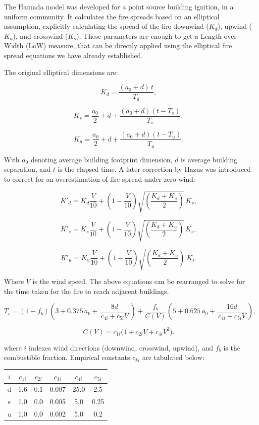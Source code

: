 The Hamada model was developed for a point source building ignition, in a uniform community. It calculates the fire spreads based on an elliptical assumption, explicitly calculating the spread of the fire downwind ($K_d$), upwind ($K_u$), and crosswind ($K_s$). These parameters are enough to get a Length over Width (LoW) measure, that can be directly applied using the elliptical fire spread equations we have already established. 

The original elliptical dimensions are: 

\[
K_d = \frac{(a_0 + d)\,t}{T_d},
\]

\[
K_s = \frac{a_0}{2} + d + \frac{(a_0 + d)(t - T_s)}{T_s},
\]

\[
K_u = \frac{a_0}{2} + d + \frac{(a_0 + d)(t - T_u)}{T_u}.
\]

With $a_0$ denoting average building footprint dimension, $d$ is average building separation, and $t$ is the elapsed time. A later correction by Hazus was introduced to correct for an overestimation of fire spread under zero wind:

\[
K'_{d}
= K_{d}\frac{V}{10}
+ \left(1 - \frac{V}{10}\right)
  \sqrt{\left(\frac{K_{d} + K_{u}}{2}\right)}\,K_{s},
\]

\[
K'_{s}
= K_{s}\frac{V}{10}
+ \left(1 - \frac{V}{10}\right)
  \sqrt{\left(\frac{K_{d} + K_{u}}{2}\right)}\,K_{s},
\]

\[
K'_{u}
= K_{u}\frac{V}{10}
+ \left(1 - \frac{V}{10}\right)
  \sqrt{\left(\frac{K_{d} + K_{u}}{2}\right)}\,K_{s}.
\]

Where $V$ is the wind speed. The above equations can be rearranged to solve for the time taken for the fire to reach adjacent buildings. 

\[
T_i
=
(1 - f_b)\left(
  3 + 0.375\,a_0
  + \frac{8d}{\,c_{4i} + c_{5i}V\,}
\right)
+
\frac{f_b}{C(V)}\left(
  5 + 0.625\,a_0
  + \frac{16d}{\,c_{4i} + c_{5i}V\,}
\right),
\]

\[
C(V) = c_{1i}\bigl(1 + c_{2i}V + c_{4i}V^{2}\bigr).
\]


where $i$ indexes wind directions (downwind, crosswind, upwind), and $f_b$ is the combustible fraction. Empirical constants $c_{ki}$ are tabulated below:

\begin{table}[h!]
\centering
\begin{tabular}{c c c c c c}
\hline
$i$ & $c_{1i}$ & $c_{2i}$ & $c_{3i}$ & $c_{4i}$ & $c_{5i}$ \\
\hline
d & 1.6 & 0.1 & 0.007 & 25.0 & 2.5 \\
s & 1.0 & 0.0 & 0.005 & 5.0  & 0.25 \\
u & 1.0 & 0.0 & 0.002 & 5.0  & 0.2 \\
\hline
\end{tabular}
\end{table}

